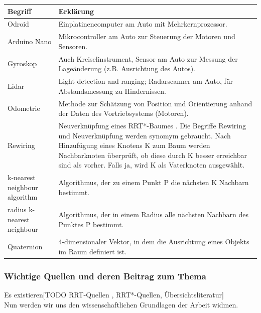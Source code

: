 \begin{tabularx}{\textwidth}{l|X}
 \textbf{Begriff}  & \textbf{Erklärung}  \\
\hline 
Odroid & Einplatinencomputer am Auto mit Mehrkernprozessor. \\
Arduino Nano & Mikrocontroller am Auto zur Steuerung der Motoren und Sensoren.\\
Gyroskop & Auch Kreiselinstrument, Sensor am Auto zur Messung der Lageänderung (z.B. Ausrichtung des Autos).\\
Lidar & Light detection and ranging; Radarscanner am Auto, für Abstandsmessung zu Hindernissen.\\
Odometrie & Methode zur Schätzung von Position und Orientierung anhand der Daten des Vortriebsystems (Motoren).\\
Rewiring & Neuverknüpfung eines RRT*-Baumes \citep{KaFra10}. Die Begriffe Rewiring und Neuverknüpfung werden synomym gebraucht. Nach Hinzufügung eines Knotens K zum Baum werden Nachbarknoten überprüft, ob diese durch K besser erreichbar sind als vorher. Falls ja, wird K als Vaterknoten ausgewählt. \\
k-nearest neighbour algorithm & Algorithmus, der zu einem Punkt P die nächsten K Nachbarn bestimmt.\\
radius k-nearest neighbour & Algorithmus, der in einem Radius alle nächsten Nachbarn des Punktes P bestimmt.\\
Quaternion & 4-dimensionaler Vektor, in dem die Ausrichtung eines Objekts im Raum definiert ist.\\
\end{tabularx}
\subsubsection{Wichtige Quellen und deren Beitrag zum Thema}
Es existieren[TODO RRT-Quellen \citep[vgl][]{Lav98}, RRT*-Quellen, Übersichtsliteratur]
\\
Nun werden wir uns den wissenschaftlichen Grundlagen der Arbeit widmen.

